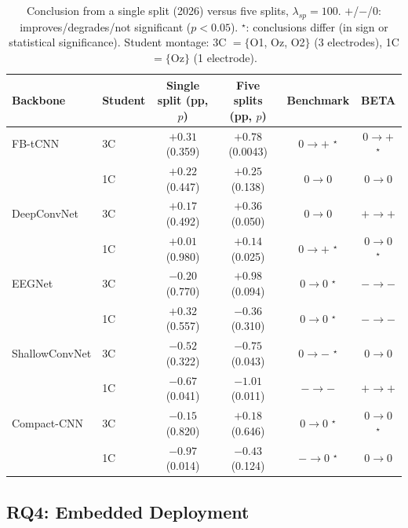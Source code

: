 \documentclass[11pt,a4paper,twoside,asymmetric]{article}
\begin{document}
\begin{table}[htbp]
\caption{Conclusion from a single split (2026) versus five splits, $\lambda_{sp}=100$. $+$/$-$/$0$: improves/degrades/not significant ($p<0.05$). $^\star$: conclusions differ (in sign or statistical significance). Student montage: 3C $=\{$O1, Oz, O2$\}$ (3 electrodes), 1C $=\{$Oz$\}$ (1 electrode).}
\label{tab:rq3}
\begin{center}
\footnotesize
\begin{tabular}{llcccc}
\toprule
Backbone & Student & Single split (pp, $p$) & Five splits (pp, $p$) & Benchmark & BETA \\
\midrule
FB-tCNN & 3C & $+0.31$ (0.359) & $+0.78$ (0.0043) & $0 \to +$ $^\star$ & $0 \to +$ $^\star$ \\
 & 1C & $+0.22$ (0.447) & $+0.25$ (0.138) & $0 \to 0$ & $0 \to 0$ \\
DeepConvNet & 3C & $+0.17$ (0.492) & $+0.36$ (0.050) & $0 \to 0$ & $+ \to +$ \\
 & 1C & $+0.01$ (0.980) & $+0.14$ (0.025) & $0 \to +$ $^\star$ & $0 \to 0$ $^\star$ \\
EEGNet & 3C & $-0.20$ (0.770) & $+0.98$ (0.094) & $0 \to 0$ $^\star$ & $- \to -$ \\
 & 1C & $+0.32$ (0.557) & $-0.36$ (0.310) & $0 \to 0$ $^\star$ & $- \to -$ \\
ShallowConvNet & 3C & $-0.52$ (0.322) & $-0.75$ (0.043) & $0 \to -$ $^\star$ & $0 \to 0$ \\
 & 1C & $-0.67$ (0.041) & $-1.01$ (0.011) & $- \to -$ & $+ \to +$ \\
Compact-CNN & 3C & $-0.15$ (0.820) & $+0.18$ (0.646) & $0 \to 0$ $^\star$ & $0 \to 0$ $^\star$ \\
 & 1C & $-0.97$ (0.014) & $-0.43$ (0.124) & $- \to 0$ $^\star$ & $0 \to 0$ \\
\bottomrule
\end{tabular}
\end{center}
\end{table}

\subsection{RQ4: Embedded Deployment}
\label{sec:rq4}
\end{document}
